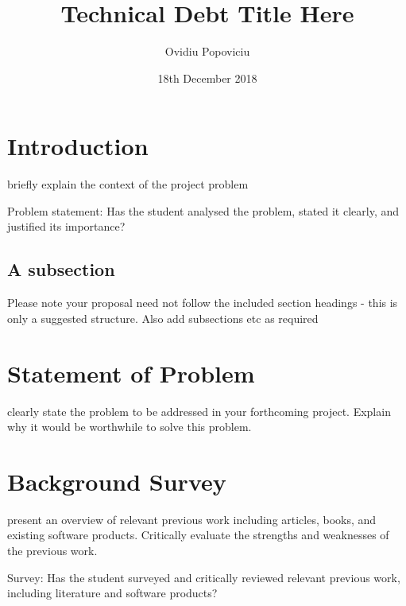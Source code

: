\documentclass{mprop}
\begin{document}
\title{Technical Debt Title Here}
\author{Ovidiu Popoviciu}
\date{18th December 2018}
\maketitle

\tableofcontents
\newpage

\section{Introduction}\label{intro}

briefly explain the context of the project problem

Problem statement: Has the student analysed the problem, stated it clearly, and justified its importance?

\subsection{A subsection}
Please note your proposal need not follow the included section headings - this is only a suggested structure. Also add subsections etc as required

\section{Statement of Problem}

clearly state the problem to be addressed in your forthcoming project. Explain why it would be worthwhile to solve this problem.

\section{Background Survey}

present an overview of relevant previous work including articles, books, and existing software products. Critically evaluate the strengths and weaknesses of the previous work.

Survey: Has the student surveyed and critically reviewed relevant previous work, including literature and software products?
\end{document}
